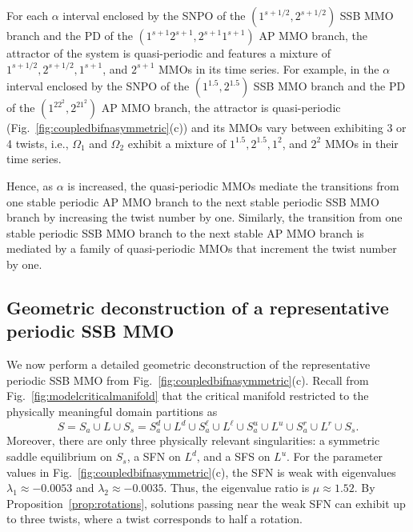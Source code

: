 \documentclass[10pt,onecolumn]{article}
\theoremstyle{plain}
\begin{document}
For each $\alpha$ interval enclosed by the SNPO of the $(1^{s+1/2},2^{s+1/2})$ SSB MMO branch and the PD of the $(1^{s+1}2^{s+1},2^{s+1}1^{s+1})$ AP MMO branch, the attractor of the system is quasi-periodic and features a mixture of $1^{s+1/2}, 2^{s+1/2}, 1^{s+1}$, and $2^{s+1}$ MMOs in its time series.  For example, in the $\alpha$ interval enclosed by the SNPO of the $(1^{1.5},2^{1.5})$ SSB MMO branch and the PD of the $(1^22^2,2^21^2)$ AP MMO branch, the attractor is quasi-periodic (Fig.~\ref{fig:coupledbifnasymmetric}(c)) and its MMOs vary between exhibiting 3 or 4 twists, i.e., $\Omega_1$ and $\Omega_2$ exhibit a mixture of $1^{1.5},2^{1.5},1^2$, and $2^2$ MMOs in their time series.

Hence, as $\alpha$ is increased, the quasi-periodic MMOs mediate the transitions from one stable periodic AP MMO branch to the next stable periodic SSB MMO branch by increasing the twist number by one. Similarly, the transition from one stable periodic SSB MMO branch to the next stable AP MMO branch is mediated by a family of quasi-periodic MMOs that increment the twist number by one.


\subsection{Geometric deconstruction of a representative periodic SSB MMO}\label{subsec:modeldecon}
We now perform a detailed geometric deconstruction of the representative periodic SSB MMO from Fig.~\ref{fig:coupledbifnasymmetric}(c). 
Recall from Fig.~\ref{fig:modelcriticalmanifold} that the critical manifold restricted to the physically meaningful domain partitions as 
%
\[ S = S_a \cup L \cup S_s = S_a^d \cup L^d \cup S_a^{\ell} \cup L^{\ell} \cup S_a^u \cup L^u \cup S_a^r \cup  L^r \cup S_s. \]
%
Moreover, there are only three physically relevant singularities: a symmetric saddle equilibrium on $S_s$, a SFN on $L^d$, and a SFS on $L^u$. 
For the parameter values in Fig.~\ref{fig:coupledbifnasymmetric}(c), the SFN is weak with eigenvalues $\lambda_1 \approx -0.0053$ and $\lambda_2 \approx -0.0035$. 
Thus, the eigenvalue ratio is $\mu \approx 1.52$. 
By Proposition~\ref{prop:rotations}, solutions passing near the weak SFN can exhibit up to three twists, where a twist corresponds to half a rotation. 
\end{document}
